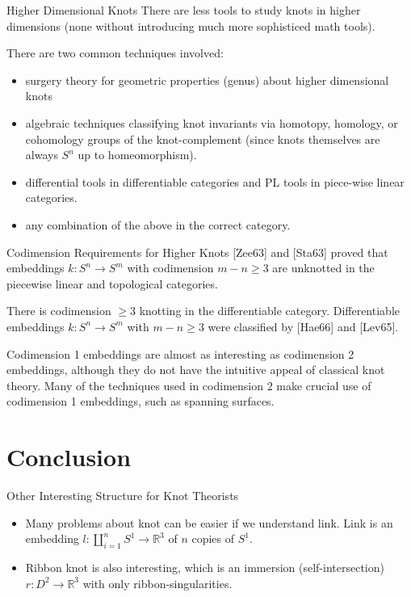 \documentclass[handout, aspectratio=169]{beamer}
\begin{document}
\begin{frame}{Higher Dimensional Knots}
    There are less tools to study knots in higher dimensions (none without introducing much more sophisticed math tools).
    
    There are two common techniques involved:
    \begin{itemize}
        \item surgery theory for geometric properties (genus) about higher dimensional knots
        \item algebraic techniques classifying knot invariants via homotopy, homology, or cohomology groups of the knot-complement (since knots themselves are always $S^n$ up to homeomorphism).
        \item differential tools in differentiable categories and PL tools in piece-wise linear categories.
        \item any combination of the above in the correct category.
    \end{itemize}
\end{frame}
\begin{frame}{Codimension Requirements for Higher Knots}
    [Zee63] and [Sta63] proved that embeddings $k: S^n \rightarrow S^m$ with codimension $m-n\geq 3$ are unknotted in the piecewise linear and topological categories.

    There is codimension $\geq 3$ knotting in the differentiable category. Differentiable embeddings $k: S^n \rightarrow S^m$ with $m - n \geq 3$ were classified by [Hae66] and [Lev65].
    
    Codimension 1 embeddings are almost as interesting as codimension 2 embeddings, although they do not have the intuitive appeal of classical knot theory. Many of the techniques used in codimension 2 make crucial use of codimension 1 embeddings, such as spanning surfaces.

\end{frame}

\section{Conclusion}
\begin{frame}{Other Interesting Structure for Knot Theorists}
\begin{itemize}
    \item Many problems about knot can be easier if we understand link. Link is an embedding $l:\coprod_{i=1}^n S^1\rightarrow \mathbb R^3$ of $n$ copies of $S^1$.
    \item Ribbon knot is also interesting, which is an immersion (self-intersection) $r:D^2\rightarrow\mathbb R^3$ with only ribbon-singularities.
\end{itemize}
\end{frame}
\end{document}
